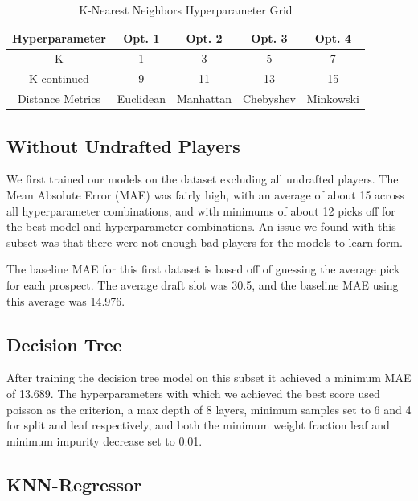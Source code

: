 \documentclass{article}
\begin{document}
\begin{table}
	\begin{center}
		\begin{tabular}{||c c c c c||} 
		\hline\hline
		Hyperparameter & Opt. 1 & Opt. 2 & Opt. 3 & Opt. 4 \\ 
		\hline\hline
		K & 1 & 3 & 5 & 7 \\ \hline
		K continued & 9 & 11 & 13 & 15 \\ \hline
		Distance Metrics & Euclidean & Manhattan & Chebyshev & Minkowski \\ \hline
		\hline\hline
		\end{tabular}
	\end{center}
	\caption{K-Nearest Neighbors Hyperparameter Grid}
	\label{tab:knn_grid}
\end{table}

\subsection{Without Undrafted Players}

We first trained our models on the dataset excluding all undrafted players. The
Mean Absolute Error (MAE) was fairly high, with an average of about 15 across
all hyperparameter combinations, and with minimums of about 12 picks off for the
best model and hyperparameter combinations. An issue we found with this subset
was that there were not enough bad players for the models to learn form. 

The baseline MAE for this first dataset is based off of guessing the average
pick for each prospect. The average draft slot was 30.5, and the baseline MAE
using this average was 14.976.

\subsection{Decision Tree}

After training the decision tree model on this subset it achieved a minimum MAE
of 13.689. The hyperparameters with which we achieved the best score used
poisson as the criterion, a max depth of 8 layers, minimum samples set to 6 and
4 for split and leaf respectively, and both the minimum weight fraction leaf and
minimum impurity decrease set to 0.01.

\subsection{KNN-Regressor}
\end{document}
